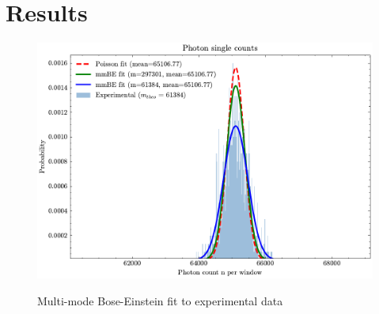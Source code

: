 \section{Results}

\begin{figure}[!h]
	\centering
	\includegraphics[width=.8\linewidth]{Images/mmBE_Test.pdf}
	\label{fig:mmBE}
	\caption{Multi-mode Bose-Einstein fit to experimental data}
\end{figure}